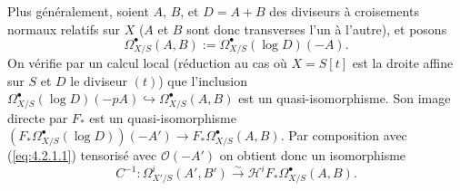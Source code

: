\documentclass[12pt,a4paper]{article}
\theoremstyle{plain}
\theoremstyle{definition}
\theoremstyle{remark}
\newcommand{\cO}{\mathcal{O}}
\begin{document}
Plus g\'en\'eralement, soient $A$, $B$, et $D = A + B$ des diviseurs \`a croisements normaux relatifs sur $X$ ($A$ et $B$ sont donc transverses l'un \`a l'autre), et posons
\begin{equation}\label{eq:4.2.1.2}
\Omega^{\bullet}_{X/S}(A, B) := \Omega^{\bullet}_{X/S}(\log D)(-A).
\end{equation}
On v\'erifie par un calcul local (r\'eduction au cas o\`u $X = S[t]$ est la droite affine sur $S$ et $D$ le diviseur $(t)$) que l'inclusion $\Omega^{\bullet}_{X/S}(\log D)(-pA) \hookrightarrow \Omega^{\bullet}_{X/S}(A, B)$ est un quasi-isomorphisme. Son image directe par $F_*$ est un quasi-isomorphisme $(F_* \Omega^{\bullet}_{X/S}(\log D))(-A') \to F_* \Omega^{\bullet}_{X/S}(A, B)$. Par composition avec (\ref{eq:4.2.1.1}) tensoris\'e avec $\cO(-A')$ on obtient donc un isomorphisme
\begin{equation}\label{eq:4.2.1.3}
C^{-1}: \Omega^i_{X'/S}(A', B') \xrightarrow{\sim} \mathscr{H}^i F_* \Omega^{\bullet}_{X/S}(A, B).
\end{equation}
\end{document}
